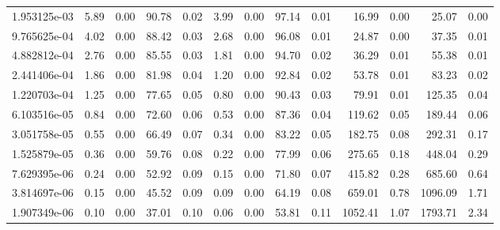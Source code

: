 \begin{tabular}{lrrrrrrrrrrrr}
1.953125e-03 &        5.89 &        0.00 &         90.78 &          0.02 &           3.99 &           0.00 &        97.14 &         0.01 &            16.99 &             0.00 &           25.07 &            0.00 \\
9.765625e-04 &        4.02 &        0.00 &         88.42 &          0.03 &           2.68 &           0.00 &        96.08 &         0.01 &            24.87 &             0.00 &           37.35 &            0.01 \\
4.882812e-04 &        2.76 &        0.00 &         85.55 &          0.03 &           1.81 &           0.00 &        94.70 &         0.02 &            36.29 &             0.01 &           55.38 &            0.01 \\
2.441406e-04 &        1.86 &        0.00 &         81.98 &          0.04 &           1.20 &           0.00 &        92.84 &         0.02 &            53.78 &             0.01 &           83.23 &            0.02 \\
1.220703e-04 &        1.25 &        0.00 &         77.65 &          0.05 &           0.80 &           0.00 &        90.43 &         0.03 &            79.91 &             0.01 &          125.35 &            0.04 \\
6.103516e-05 &        0.84 &        0.00 &         72.60 &          0.06 &           0.53 &           0.00 &        87.36 &         0.04 &           119.62 &             0.05 &          189.44 &            0.06 \\
3.051758e-05 &        0.55 &        0.00 &         66.49 &          0.07 &           0.34 &           0.00 &        83.22 &         0.05 &           182.75 &             0.08 &          292.31 &            0.17 \\
1.525879e-05 &        0.36 &        0.00 &         59.76 &          0.08 &           0.22 &           0.00 &        77.99 &         0.06 &           275.65 &             0.18 &          448.04 &            0.29 \\
7.629395e-06 &        0.24 &        0.00 &         52.92 &          0.09 &           0.15 &           0.00 &        71.80 &         0.07 &           415.82 &             0.28 &          685.60 &            0.64 \\
3.814697e-06 &        0.15 &        0.00 &         45.52 &          0.09 &           0.09 &           0.00 &        64.19 &         0.08 &           659.01 &             0.78 &         1096.09 &            1.71 \\
1.907349e-06 &        0.10 &        0.00 &         37.01 &          0.10 &           0.06 &           0.00 &        53.81 &         0.11 &          1052.41 &             1.07 &         1793.71 &            2.34 \\

\end{tabular}
